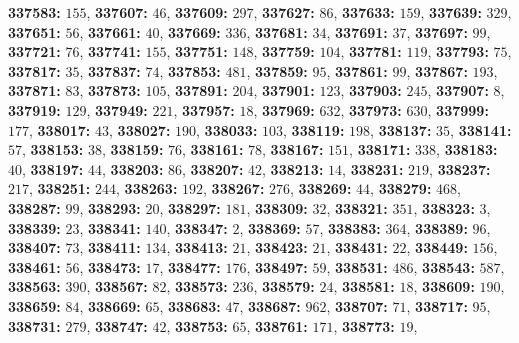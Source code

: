 \textsf{\bfseries 337583:} $155$, \textsf{\bfseries 337607:} $46$, \textsf{\bfseries 337609:} $297$, \textsf{\bfseries 337627:} $86$, \textsf{\bfseries 337633:} $159$, \textsf{\bfseries 337639:} $329$, \textsf{\bfseries 337651:} $56$, \textsf{\bfseries 337661:} $40$, \textsf{\bfseries 337669:} $336$, \textsf{\bfseries 337681:} $34$, \textsf{\bfseries 337691:} $37$, \textsf{\bfseries 337697:} $99$, \textsf{\bfseries 337721:} $76$, \textsf{\bfseries 337741:} $155$, \textsf{\bfseries 337751:} $148$, \textsf{\bfseries 337759:} $104$, \textsf{\bfseries 337781:} $119$, \textsf{\bfseries 337793:} $75$, \textsf{\bfseries 337817:} $35$, \textsf{\bfseries 337837:} $74$, \textsf{\bfseries 337853:} $481$, \textsf{\bfseries 337859:} $95$, \textsf{\bfseries 337861:} $99$, \textsf{\bfseries 337867:} $193$, \textsf{\bfseries 337871:} $83$, \textsf{\bfseries 337873:} $105$, \textsf{\bfseries 337891:} $204$, \textsf{\bfseries 337901:} $123$, \textsf{\bfseries 337903:} $245$, \textsf{\bfseries 337907:} $8$, \textsf{\bfseries 337919:} $129$, \textsf{\bfseries 337949:} $221$, \textsf{\bfseries 337957:} $18$, \textsf{\bfseries 337969:} $632$, \textsf{\bfseries 337973:} $630$, \textsf{\bfseries 337999:} $177$, \textsf{\bfseries 338017:} $43$, \textsf{\bfseries 338027:} $190$, \textsf{\bfseries 338033:} $103$, \textsf{\bfseries 338119:} $198$, \textsf{\bfseries 338137:} $35$, \textsf{\bfseries 338141:} $57$, \textsf{\bfseries 338153:} $38$, \textsf{\bfseries 338159:} $76$, \textsf{\bfseries 338161:} $78$, \textsf{\bfseries 338167:} $151$, \textsf{\bfseries 338171:} $338$, \textsf{\bfseries 338183:} $40$, \textsf{\bfseries 338197:} $44$, \textsf{\bfseries 338203:} $86$, \textsf{\bfseries 338207:} $42$, \textsf{\bfseries 338213:} $14$, \textsf{\bfseries 338231:} $219$, \textsf{\bfseries 338237:} $217$, \textsf{\bfseries 338251:} $244$, \textsf{\bfseries 338263:} $192$, \textsf{\bfseries 338267:} $276$, \textsf{\bfseries 338269:} $44$, \textsf{\bfseries 338279:} $468$, \textsf{\bfseries 338287:} $99$, \textsf{\bfseries 338293:} $20$, \textsf{\bfseries 338297:} $181$, \textsf{\bfseries 338309:} $32$, \textsf{\bfseries 338321:} $351$, \textsf{\bfseries 338323:} $3$, \textsf{\bfseries 338339:} $23$, \textsf{\bfseries 338341:} $140$, \textsf{\bfseries 338347:} $2$, \textsf{\bfseries 338369:} $57$, \textsf{\bfseries 338383:} $364$, \textsf{\bfseries 338389:} $96$, \textsf{\bfseries 338407:} $73$, \textsf{\bfseries 338411:} $134$, \textsf{\bfseries 338413:} $21$, \textsf{\bfseries 338423:} $21$, \textsf{\bfseries 338431:} $22$, \textsf{\bfseries 338449:} $156$, \textsf{\bfseries 338461:} $56$, \textsf{\bfseries 338473:} $17$, \textsf{\bfseries 338477:} $176$, \textsf{\bfseries 338497:} $59$, \textsf{\bfseries 338531:} $486$, \textsf{\bfseries 338543:} $587$, \textsf{\bfseries 338563:} $390$, \textsf{\bfseries 338567:} $82$, \textsf{\bfseries 338573:} $236$, \textsf{\bfseries 338579:} $24$, \textsf{\bfseries 338581:} $18$, \textsf{\bfseries 338609:} $190$, \textsf{\bfseries 338659:} $84$, \textsf{\bfseries 338669:} $65$, \textsf{\bfseries 338683:} $47$, \textsf{\bfseries 338687:} $962$, \textsf{\bfseries 338707:} $71$, \textsf{\bfseries 338717:} $95$, \textsf{\bfseries 338731:} $279$, \textsf{\bfseries 338747:} $42$, \textsf{\bfseries 338753:} $65$, \textsf{\bfseries 338761:} $171$, \textsf{\bfseries 338773:} $19$, 
